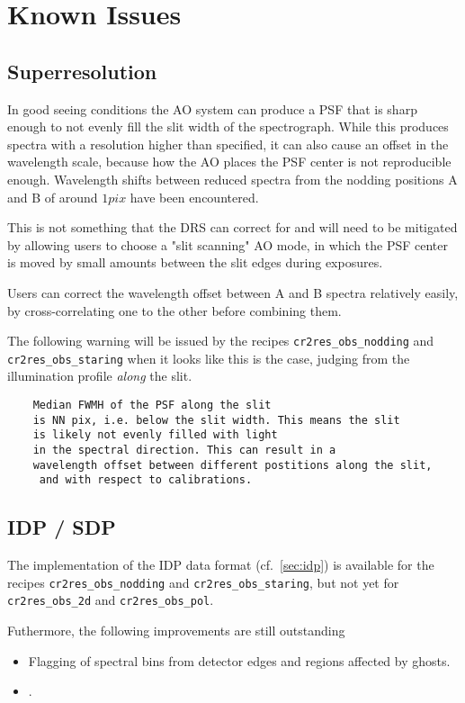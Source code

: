 \section{Known Issues}
\label{sec:knownissues}

\subsection{Superresolution}
In good seeing conditions the AO system can produce a PSF that is sharp enough
to not evenly fill the slit width of the spectrograph. While this produces spectra with a resolution higher than specified, it can also cause an offset in the wavelength scale, because how the AO places the PSF center is not reproducible enough. Wavelength shifts between reduced spectra from the nodding positions A and B of around $1 pix$ have been encountered.

This is not something that the DRS can correct for and will need to be mitigated
by allowing users to choose a "slit scanning" AO mode, in which the PSF center
is moved by small amounts between the slit edges during exposures.

Users can correct the wavelength offset between A and B spectra relatively easily, by cross-correlating one to the other before combining them.

The following warning will be issued by the recipes \verb!cr2res_obs_nodding!
and \verb!cr2res_obs_staring! when it looks like this is the case, judging from
the illumination profile \emph{along} the slit. 
\begin{verbatim}
    Median FWMH of the PSF along the slit 
    is NN pix, i.e. below the slit width. This means the slit 
    is likely not evenly filled with light 
    in the spectral direction. This can result in a 
    wavelength offset between different postitions along the slit,
     and with respect to calibrations.
\end{verbatim}

\subsection{IDP / SDP}
The implementation of the IDP data format (cf.~\ref{sec:idp}) is available for the recipes \verb!cr2res_obs_nodding! and \verb!cr2res_obs_staring!, but not yet for \verb!cr2res_obs_2d! and \verb!cr2res_obs_pol!.

Futhermore, the following improvements are still outstanding

\begin{itemize}
    \item Flagging of spectral bins from detector edges and regions affected by ghosts.
    \item .
    
\end{itemize}

